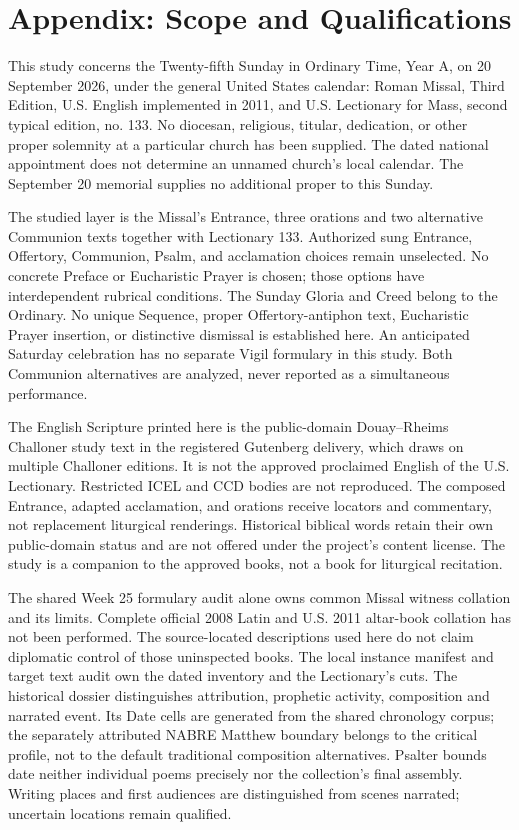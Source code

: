 \section{Appendix: Scope and Qualifications}
This study concerns the Twenty-fifth Sunday in Ordinary Time, Year A, on 20 September 2026, under the general United States calendar: Roman Missal, Third Edition, U.S. English implemented in 2011, and U.S. Lectionary for Mass, second typical edition, no. 133. No diocesan, religious, titular, dedication, or other proper solemnity at a particular church has been supplied. The dated national appointment does not determine an unnamed church's local calendar. The September 20 memorial supplies no additional proper to this Sunday.

The studied layer is the Missal's Entrance, three orations and two alternative Communion texts together with Lectionary 133. Authorized sung Entrance, Offertory, Communion, Psalm, and acclamation choices remain unselected. No concrete Preface or Eucharistic Prayer is chosen; those options have interdependent rubrical conditions. The Sunday Gloria and Creed belong to the Ordinary. No unique Sequence, proper Offertory-antiphon text, Eucharistic Prayer insertion, or distinctive dismissal is established here. An anticipated Saturday celebration has no separate Vigil formulary in this study. Both Communion alternatives are analyzed, never reported as a simultaneous performance.

The English Scripture printed here is the public-domain Douay--Rheims Challoner study text in the registered Gutenberg delivery, which draws on multiple Challoner editions. It is not the approved proclaimed English of the U.S. Lectionary. Restricted ICEL and CCD bodies are not reproduced. The composed Entrance, adapted acclamation, and orations receive locators and commentary, not replacement liturgical renderings. Historical biblical words retain their own public-domain status and are not offered under the project's content license. The study is a companion to the approved books, not a book for liturgical recitation.

The shared Week 25 formulary audit alone owns common Missal witness collation and its limits. Complete official 2008 Latin and U.S. 2011 altar-book collation has not been performed. The source-located descriptions used here do not claim diplomatic control of those uninspected books. The local instance manifest and target text audit own the dated inventory and the Lectionary's cuts. The historical dossier distinguishes attribution, prophetic activity, composition and narrated event. Its Date cells are generated from the shared chronology corpus; the separately attributed NABRE Matthew boundary belongs to the critical profile, not to the default traditional composition alternatives. Psalter bounds date neither individual poems precisely nor the collection's final assembly. Writing places and first audiences are distinguished from scenes narrated; uncertain locations remain qualified.

